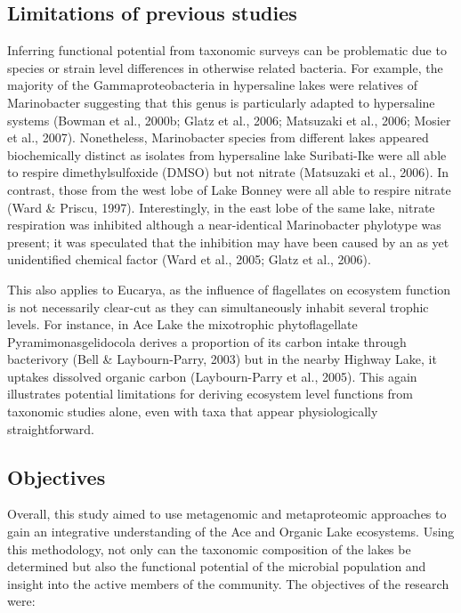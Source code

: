 \documentclass{book}
\begin{document}
\subsection{Limitations of previous studies}
Inferring functional potential from taxonomic surveys can be problematic due to species or strain level differences in otherwise related bacteria.
For example, the majority of the Gammaproteobacteria in hypersaline lakes were relatives of Marinobacter suggesting that this genus is particularly adapted to hypersaline systems (Bowman et al., 2000b; Glatz et al., 2006; Matsuzaki et al., 2006; Mosier et al., 2007).
Nonetheless, Marinobacter species from different lakes appeared biochemically distinct as isolates from hypersaline lake Suribati-Ike were all able to respire dimethylsulfoxide (DMSO) but not nitrate (Matsuzaki et al., 2006). 
In contrast, those from the west lobe of Lake Bonney were all able to respire nitrate (Ward & Priscu, 1997). 
Interestingly, in the east lobe of the same lake, nitrate respiration was inhibited although a near-identical Marinobacter phylotype was present; it was speculated that the inhibition may have been caused by an as yet unidentified chemical factor (Ward et al., 2005; Glatz et al., 2006). 

This also applies to Eucarya, as the influence of flagellates on ecosystem function is not necessarily clear-cut as they can simultaneously inhabit several trophic levels. 
For instance, in Ace Lake the mixotrophic phytoflagellate Pyramimonasgelidocola derives a proportion of its carbon intake through bacterivory (Bell & Laybourn-Parry, 2003) but in the nearby Highway Lake, it uptakes dissolved organic carbon (Laybourn-Parry et al., 2005). 
This again illustrates potential limitations for deriving ecosystem level functions from taxonomic studies alone, even with taxa that appear physiologically straightforward. 



\subsection{Objectives}

Overall, this study aimed to use metagenomic and metaproteomic approaches to gain an integrative understanding of the Ace and Organic Lake ecosystems. 
Using this methodology, not only can the taxonomic composition of the lakes be determined but also the functional potential of the microbial population and insight into the active members of the community.
The objectives of the research were:
\end{document}
